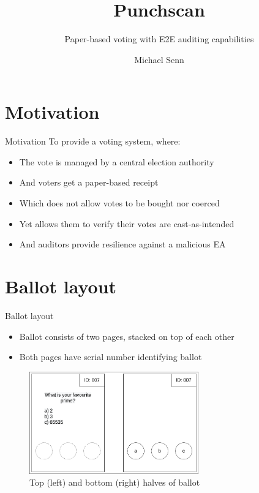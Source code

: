 \documentclass{beamer}
\title{Punchscan}
\subtitle{Paper-based voting with E2E auditing capabilities}
\author{Michael Senn}
\institute{Faculty of Science, University of Bern}
\date{\DTMusedate{presentation}}
\begin{document}
\maketitle

\section{Motivation}

\begin{frame}{Motivation}
	To provide a voting system, where:
	\begin{itemize}
		\item The vote is managed by a central election authority
		\item And voters get a paper-based receipt
		\item Which does not allow votes to be bought nor coerced
		\item Yet allows them to verify their votes are cast-as-intended
		\item And auditors provide resilience against a malicious EA
	\end{itemize}
\end{frame}

\section{Ballot layout}

\begin{frame}{Ballot layout}
	\begin{itemize}
		\item Ballot consists of two pages, stacked on top of each other
		\item Both pages have serial number identifying ballot
	\end{itemize}
	\begin{figure}
		\centering
		\includegraphics[width=0.65\textwidth]{../resources/high_level_ballot.drawio.png}
		\caption{Top (left) and bottom (right) halves of ballot}
	\end{figure}
\end{frame}
\end{document}
